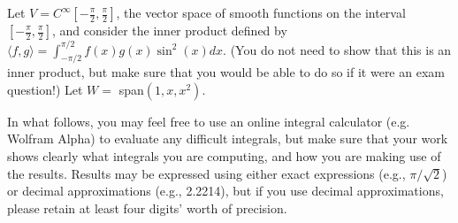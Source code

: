 \documentclass[12pt]{exam}
\begin{document}
\begin{questions}
\clearpage

\question Let $V = C^\infty \left[ -\frac{\pi}{2}, \frac{\pi}{2}\right]$, the vector space of smooth functions on the interval $\left[ -\frac{\pi}{2}, \frac{\pi}{2}\right]$, and consider the inner product defined by $\langle f, g\rangle = \int_{-\pi/2}^{\pi/2} f (x)g(x) \sin^2(x) dx$. (You do not need to show that this is an inner product, but make sure that you would be able to do so if it were an exam question!) Let $W = $ span$(1, x, x^2)$.
\par In what follows, you may feel free to use an online integral calculator (e.g. Wolfram Alpha) to evaluate any difficult integrals, but make sure that your work shows clearly what integrals you are computing, and how you are making use of the results. Results may be expressed using either exact expressions (e.g., $\pi/\sqrt2$) or decimal approximations (e.g., 2.2214), but if you use decimal approximations, please retain at least four digits' worth of precision.
\end{questions}
\end{document}

